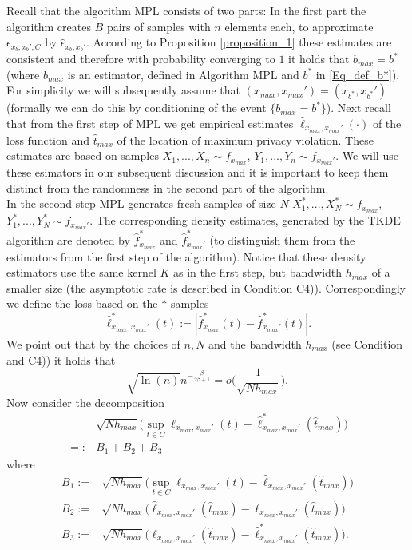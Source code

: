 \documentclass[conference]{IEEEtran}
\begin{document}
Recall that the algorithm MPL consists of two parts: In the first part the algorithm creates $B$ pairs of samples with $n$ elements each, to approximate $\epsilon_{x_b,x_b',C}$ by $\hat \epsilon_{x_b,x_b'}$. According to Proposition \ref{proposition_1} these estimates are consistent and therefore with probability converging to $1$ it holds that $b_{max}=b^*$ (where $b_{max}$ 
is an estimator, defined in Algorithm MPL and $b^*$ in \eqref{Eq_def_b*}). For simplicity  we will subsequently  assume that $(x_{max}, x_{max}')= (x_{b^*}, x_{b^*}')$ (formally we can do this by conditioning of the event $\{ b_{max}=b^* \}$).
Next recall that from the first step of MPL we get empirical estimates $\hat \ell_{x_{max}, x_{max}'}(\cdot)$ of the loss function and $\hat t_{max}$ of the location of maximum privacy violation. These estimates are based on samples $X_1,...,X_n \sim f_{x_{max}}$, $Y_1,...,Y_n \sim f_{x_{max}'}$. We will use these esimators in our subsequent discussion and it is important to keep them distinct from the randomness in the second part of the algorithm.\\
In the second step MPL generates fresh samples of size $N$ $X_1^*,...,X_N^* \sim f_{x_{max}}$, $Y_1^*,...,Y_N^* \sim f_{x_{max}'}$. The corresponding density estimates, generated by the TKDE algorithm are denoted by $\hat f_{x_{max}}^*$ and $\hat f_{x_{max}'}^*$ (to distinguish them from the estimators from the first step of the algorithm). Notice that these density estimators use the same kernel $K$ as in the first step, but bandwidth $h_{max}$ of a smaller size (the asymptotic rate is described in Condition C4)). Correspondingly we define the loss based on the $*$-samples 
$$
\hat \ell_{x_{max}, x_{max}'}^*(t) := |\hat f_{x_{max}}^*(t)-\hat f_{x_{max}'}^*(t)|.
$$
We point out that by the choices of $n,N$ and the bandwidth $h_{max}$  (see Condition and C4)) it holds that 
\begin{equation}\label{Eq_van_bias_1}
 \sqrt{\ln(n)} n^{-\frac{\beta}{2\beta+1}} = o\Big( \frac{1}{\sqrt{Nh_{max}}}\Big).
\end{equation}
Now consider the decomposition
\begin{align} \label{Eq_B_decomposition}
   & \sqrt{N h_{max}} \big( \sup_{t \in C}\ell_{x_{max},x_{max}'}(t)-\hat \ell_{x_{max},x_{max}'}^*(\hat t_{max})\big)\\
   =:&B_1+B_2+B_3 \nonumber
\end{align}
where
\begin{align*}
    B_1 := &  \sqrt{N h_{max}} \big( \sup_{t \in C}\ell_{x_{max},x_{max}'}(t) - \hat \ell_{x_{max},x_{max}'}(\hat t_{max})\big) \\
    B_2 := &   \sqrt{N h_{max}} \big( \hat \ell_{x_{max},x_{max}'}(\hat t_{max})-  \ell_{x_{max},x_{max}'}(\hat t_{max})\big)\\
    B_3 := &   \sqrt{N h_{max}}  \big( \ell_{x_{max},x_{max}'}(\hat t_{max})-\hat \ell_{x_{max},x_{max}'}^*(\hat t_{max})\big).
\end{align*}
\end{document}
